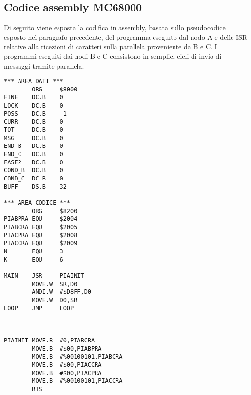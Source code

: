 \documentclass{article}
\begin{document}
\subsection{Codice assembly MC68000}
Di seguito viene esposta la codifica in assembly, basata sullo pseudocodice esposto nel paragrafo precedente, del programma eseguito dal nodo A e delle ISR relative alla ricezioni di caratteri sulla parallela proveniente da B e C. I programmi eseguiti dai nodi B e C consistono in semplici cicli di invio di messaggi tramite parallela. 
\vspace{2\baselineskip}

\begin{lstlisting}[language=RISCAsm]
*** AREA DATI ***        
        ORG     $8000
FINE    DC.B    0
LOCK    DC.B    0
POSS    DC.B    -1
CURR    DC.B    0
TOT     DC.B    0
MSG     DC.B    0 
END_B   DC.B    0 
END_C   DC.B    0 
FASE2   DC.B    0
COND_B  DC.B    0
COND_C  DC.B    0
BUFF    DS.B    32

*** AREA CODICE *** 
        ORG     $8200
PIABPRA EQU     $2004
PIABCRA EQU     $2005
PIACPRA EQU     $2008
PIACCRA EQU     $2009
N       EQU     3
K       EQU     6

MAIN    JSR     PIAINIT
        MOVE.W  SR,D0 
        ANDI.W  #$D8FF,D0
        MOVE.W  D0,SR 
LOOP    JMP     LOOP 


		
PIAINIT	MOVE.B  #0,PIABCRA
        MOVE.B  #$00,PIABPRA 
        MOVE.B  #%00100101,PIABCRA
        MOVE.B  #$00,PIACCRA
        MOVE.B  #$00,PIACPRA 
        MOVE.B  #%00100101,PIACCRA
        RTS  


\end{lstlisting}
\end{document}
